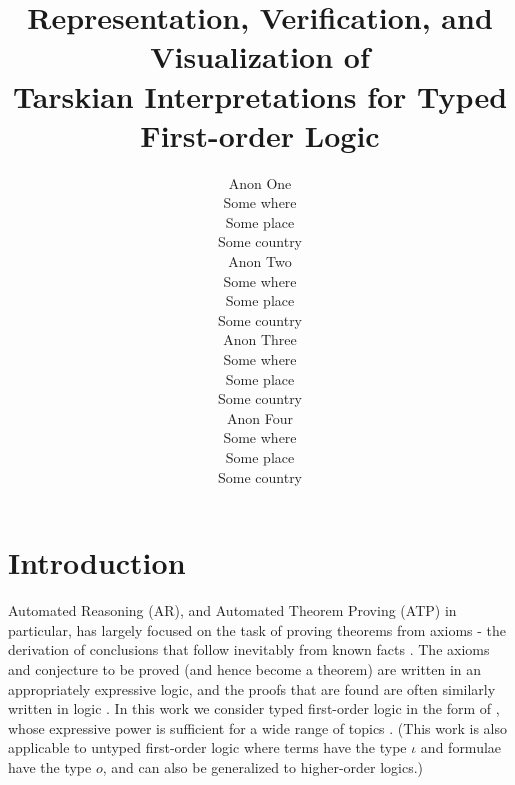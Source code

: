 \documentclass[letterpaper]{article}
\begin{document}

\title{Representation, Verification, and Visualization of\\
Tarskian Interpretations for Typed First-order Logic}
\author{Anon One\\
Some where\\
Some place\\
Some country\\
\And
Anon Two\\
Some where\\
Some place\\
Some country\\
\And
Anon Three\\
Some where\\
Some place\\
Some country\\
\And
Anon Four\\
Some where\\
Some place\\
Some country}

\maketitle
\begin{abstract}
\begin{quote}
\end{quote}
\end{abstract}
\section{Introduction}
\label{Introduction}

Automated Reasoning (AR), and Automated Theorem Proving (ATP) in particular, has largely focused
on the task of proving theorems from axioms - the derivation of conclusions that follow inevitably 
from known facts \cite{RV01-HAR}.
The axioms and conjecture to be proved (and hence become a theorem) are written in an 
appropriately expressive logic, and the proofs that are found are often similarly written in
logic \cite{SS+06}.
In this work we consider typed first-order logic in the form of \cite{Wal83,Sch85,Coh87},
whose expressive power is sufficient for a wide range of topics \cite{Sut17}.
(This work is also applicable to untyped first-order logic where terms have the type $\iota$ 
and formulae have the type $o$, and can also be generalized to higher-order logics.)
\end{document}
